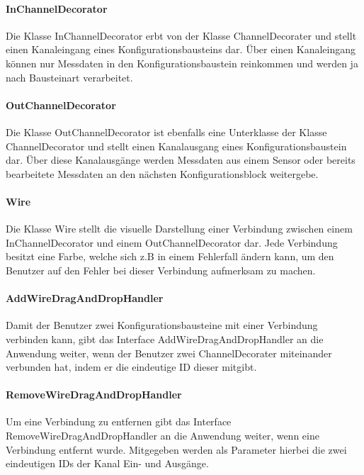 \documentclass[parskip=full]{scrartcl}
\begin{document}
\paragraph{InChannelDecorator}

Die Klasse InChannelDecorator erbt von der Klasse ChannelDecorater und stellt einen Kanaleingang eines Konfigurationsbausteins dar. Über einen Kanaleingang können nur Messdaten in den Konfigurationsbaustein reinkommen und werden ja nach Bausteinart verarbeitet. 

\paragraph{OutChannelDecorator}

Die Klasse OutChannelDecorator ist ebenfalls eine Unterklasse der Klasse ChannelDecorator und stellt einen Kanalausgang eines Konfigurationsbaustein dar. Über diese Kanalausgänge werden Messdaten aus einem Sensor oder bereits bearbeitete Messdaten an den nächsten Konfigurationsblock weitergebe.

\paragraph{Wire}

Die Klasse Wire stellt die visuelle Darstellung einer Verbindung zwischen einem InChannelDecorator und einem OutChannelDecorator dar. Jede Verbindung besitzt eine Farbe, welche sich z.B in einem Fehlerfall ändern kann, um den Benutzer auf den Fehler bei dieser Verbindung aufmerksam zu machen.

\paragraph{AddWireDragAndDropHandler}

Damit der Benutzer zwei Konfigurationsbausteine mit einer Verbindung verbinden kann, gibt das Interface AddWireDragAndDropHandler an die Anwendung weiter, wenn der Benutzer zwei ChannelDecorater miteinander verbunden hat, indem er die eindeutige ID dieser mitgibt.

\paragraph{RemoveWireDragAndDropHandler}

Um eine Verbindung zu entfernen gibt das Interface RemoveWireDragAndDropHandler an die Anwendung weiter, wenn eine Verbindung entfernt wurde. Mitgegeben werden als Parameter hierbei die zwei eindeutigen IDs der Kanal Ein- und Ausgänge.
\end{document}
